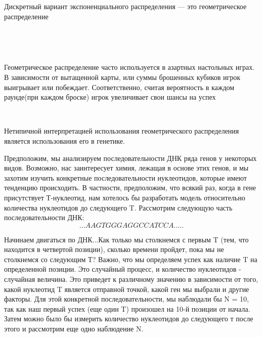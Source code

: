 \documentclass[a4paper,12pt, oneside]{book}
\begin{document}
{{Дискретный вариант экспоненциального распределения — это геометрическое распределение






\newpage
{}\\
\vspace{5mm}

\vspace{5mm}
\\
\vspace{5mm}

Геометрическое распределение часто используется в азартных настольных играх. В зависимости от вытащенной карты, или суммы брошенных кубиков игрок выигрывает или побеждает. Соответственно, считая вероятность в каждом раунде(при каждом броске) игрок увеличивает свои шансы на успех

\vspace{5mm}
\\
\vspace{5mm}

Нетипичной интерпретацией использования геометрического распределения является использования его в генетике.

Предположим, мы анализируем последовательности ДНК ряда генов у некоторых видов. Возможно, нас  заинтересует химия, лежащая в основе этих генов, и мы захотим изучить конкретные последовательности нуклеотидов, которые имеют тенденцию происходить. В частности, предположим, что всякий раз, когда в гене присутствует Т-нуклеотид, нам хотелось бы разработать модель относительно количества нуклеотидов до следующего T. Рассмотрим следующую часть последовательности ДНК: 
$$
...AAGTGGGAGGCCATCCA.....
$$

Начинаем двигаться по ДНК...Как только мы столкнемся с первым T (тем, что находится в четвертой позиции), сколько времени пройдет, пока мы не столкнемся со следующим Т? Важно, что мы определяем успех как наличие T на определенной позиции. Это случайный процесс, и количество нуклеотидов - случайная величина. Это приведет к различному значению в зависимости от того, какой нуклеотид T является отправной точкой, какой ген мы выбрали и другие факторы. Для этой конкретной последовательности, мы наблюдали бы N = 10, так как наш первый успех (еще один T) произошел на 10-й позиции от начала. Затем можно было бы измерить количество нуклеотидов до следующего т после этого и рассмотрим еще одно наблюдение N.

}}
\end{document}
